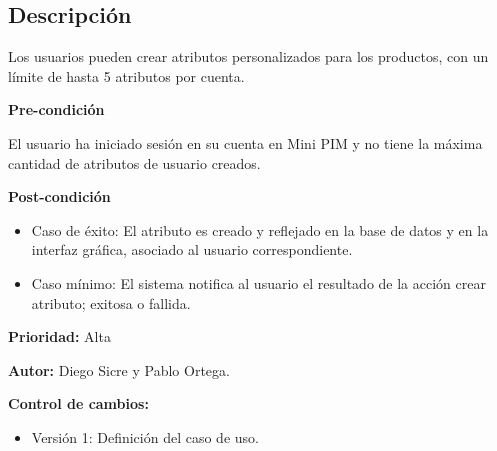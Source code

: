 
\subsection*{Descripción}
Los usuarios pueden crear atributos personalizados para los productos, con un límite de hasta 5 atributos por cuenta.
\vspace{0.15cm}

\textbf{Pre-condición}\par
El usuario ha iniciado sesión en su cuenta en Mini PIM y no tiene la máxima cantidad de atributos de usuario creados.\par
\vspace{0.15cm}

\textbf{Post-condición}
\begin{itemize}
    \item Caso de éxito: El atributo es creado y reflejado en la base de datos y en la interfaz gráfica, asociado al usuario correspondiente.
    \item Caso mínimo: El sistema notifica al usuario el resultado de la acción crear atributo; exitosa o fallida.
\end{itemize}

\textbf{Prioridad: }
Alta
\vspace{0.15cm}

\textbf{Autor: }
Diego Sicre y Pablo Ortega.\par
\vspace{0.15cm}

\textbf{Control de cambios: }
\begin{itemize}
    \item Versión 1: Definición del caso de uso.
\end{itemize}

